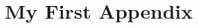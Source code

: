 \documentclass[a4paper,11pt,twoside]{report}
\begin{document}
\newpage

\appendix
\chapter{My First Appendix}\label{chapter:Appendix A}

\end{document}
